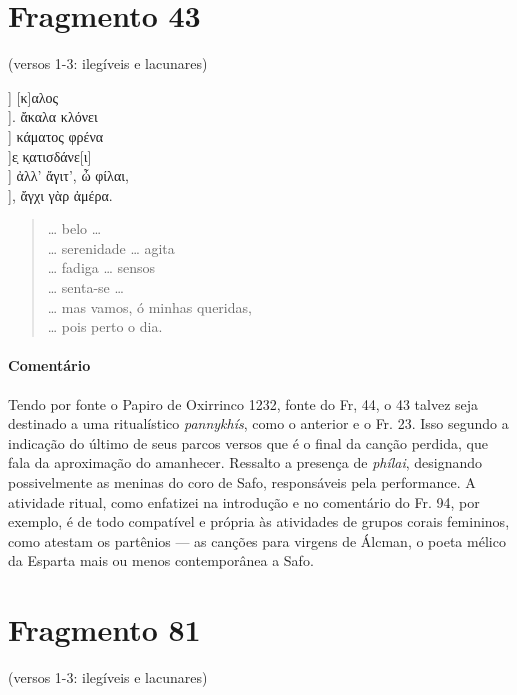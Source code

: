 {\pagebreak
\section{Fragmento 43} 

\begin{gkverse}
\textnormal{(versos 1-3: ilegíveis e lacunares)}

] [κ]αλος\\
         ]. ἄκαλα κλόνει\\
         ] κάματος φρένα\\
       ]ε̣ κ̣ατισδάνε[ι]\\
       ] ἀλλ’ ἄγιτ’, ὦ φίλαι,\\
       ], ἄγχι γὰρ ἀμέρα.
\end{gkverse}

\begin{verse}
\ldots{} belo \ldots{}\\
\ldots{} serenidade \ldots{} agita\\
\ldots{} fadiga \ldots{} sensos\\
\ldots{} senta-se \ldots{}\\
\ldots{} mas vamos, ó minhas queridas,\\
\ldots{} pois perto o dia.
\end{verse}

{\paragraph{Comentário} Tendo por fonte o Papiro de Oxirrinco 1232, fonte do Fr, 44, o 43 talvez seja destinado a uma  ritualístico \textit{pannykhís}, como o anterior e o Fr. 23. Isso segundo a indicação do último de seus parcos versos que é o final da canção perdida, que fala da aproximação do amanhecer. Ressalto a presença de \textit{phílai}, designando possivelmente as meninas do coro de Safo, responsáveis pela performance. A atividade ritual, como enfatizei na introdução e no comentário do Fr. 94, por exemplo, é de todo compatível e própria às atividades de grupos corais femininos, como atestam os partênios --- as canções para virgens de Álcman, o poeta mélico da Esparta mais ou menos contemporânea a Safo.}


\pagebreak
\section{Fragmento 81}

\begin{gkverse}
\textnormal{(versos 1-3: ilegíveis e lacunares)}


\end{gkverse}}
